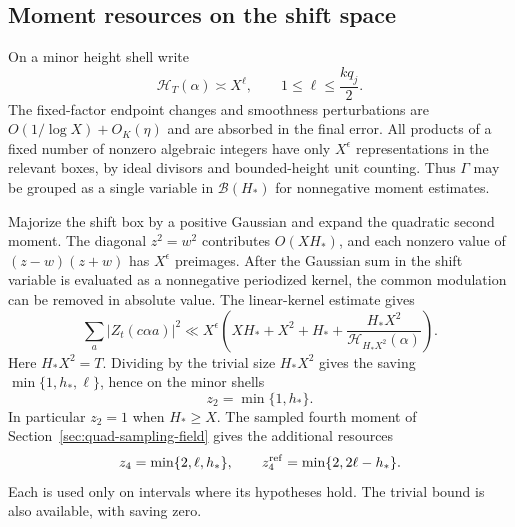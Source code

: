 \documentclass[11pt]{amsart}
\theoremstyle{definition}
\numberwithin{equation}{section}
\begin{document}
\subsection{Moment resources on the shift space}

On a minor height shell write
\[
 \mathcal H_T(\alpha)\asymp X^\ell,
 \qquad 1\le\ell\le\frac{kq_j}{2}.
\]
The fixed-factor endpoint changes and smoothness perturbations are
$O(1/\log X)+O_K(\eta)$ and are absorbed in the final error.
All products of a fixed number of nonzero algebraic integers have only
$X^\epsilon$ representations in the relevant boxes, by ideal divisors
and bounded-height unit counting. Thus $\Gamma$ may be grouped as a single
variable in $\mathcal B(H_*)$ for nonnegative moment estimates.

Majorize the shift box by a positive Gaussian and expand
the quadratic second moment. The diagonal $z^2=w^2$ contributes
$O(XH_*)$, and each nonzero value of $(z-w)(z+w)$ has
$X^\epsilon$ preimages. After the Gaussian sum in the shift
variable is evaluated as a nonnegative periodized kernel, the
common modulation can be removed in absolute value.
The linear-kernel estimate gives
\[
 \sum_a|Z_t(c\alpha a)|^2
 \ll X^\epsilon\left(XH_*+X^2+H_*+
                \frac{H_*X^2}{\mathcal H_{H_*X^2}(\alpha)}\right).
\]
Here $H_*X^2=T$. Dividing by the trivial size $H_*X^2$
gives the saving $\min\{1,h_*,\ell\}$, hence on the minor shells
\begin{equation}\label{eq:quadratic-terminal-z2}
 z_2=\min\{1,h_*\}.
\end{equation}
In particular $z_2=1$ when $H_*\ge X$.
The sampled fourth moment of Section~\ref{sec:quad-sampling-field}
gives the additional resources
\[
 z_4=\min\{2,\ell,h_*\},\qquad
 z_4^{\rm ref}=\min\{2,2\ell-h_*\}.
\]
Each is used only on intervals where its hypotheses hold.
The trivial bound is also available, with saving zero.
\end{document}
